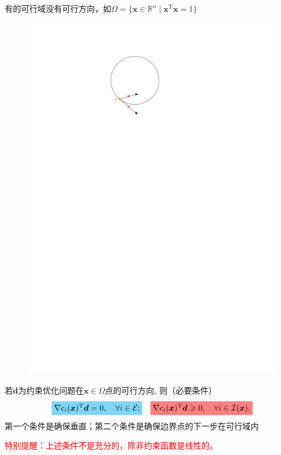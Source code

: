 \begin{note}
    有的可行域没有可行方向，如$\Omega=\{\boldsymbol{x}\in \mathbb{R}^n\mid\boldsymbol{x}^{\mathrm{T}}\boldsymbol{x}=1\}$
    \begin{figure}[H]
        \centering
        \includegraphics{image/无可行方向的可行域.pdf}
    \end{figure}
\end{note}
\begin{corollary}
    若$\boldsymbol{d}$为约束优化问题在$\boldsymbol{x}\in \Omega$点的可行方向, 则（必要条件）
    \[
        \colorbox{cyan!50}{$\nabla c_i(\boldsymbol{x})^\mathrm{T}\boldsymbol{d}=0,\quad\forall i\in\mathcal{E};$}\quad \colorbox{red!50}{$\nabla c_i(\boldsymbol{x})^\mathrm{T}\boldsymbol{d}\geqslant 0,\quad\forall i \in\mathcal{I}(\boldsymbol{x}).$}
    \]
    \colorbox{cyan!50}{第一个条件是确保垂直}；\colorbox{red!50}{第二个条件是确保边界点的下一步在可行域内}

    \textcolor{red}{特别提醒：上述条件不是充分的，除非约束函数是线性的。}
\end{corollary}
